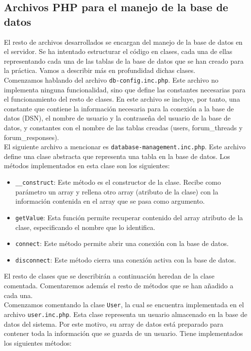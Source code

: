 \documentclass[11pt]{article}
\theoremstyle{plain}
\theoremstyle{definition}
\begin{document}
\subsection{Archivos PHP para el manejo de la base de datos}

El resto de archivos desarrollados se encargan del manejo de la base
de datos en el servidor. Se ha intentado estructurar el código en
clases, cada una de ellas representando cada una de las tablas de la
base de datos que se han creado para la práctica. Vamos
a describir más en profundidad dichas clases.\\

Comenzamos hablando del archivo \texttt{db-config.inc.php}. Este
archivo no implementa ninguna funcionalidad, sino que define las
constantes necesarias para el funcionamiento del resto de clases.  En
este archivo se incluye, por tanto, una constante que contiene la
información necesaria para la conexión a la base de datos (DSN), el
nombre de usuario y la contraseña del usuario de la base de datos, y
constantes con el nombre de las tablas creadas
(users, forum\_threads y forum\_responses).\\

El siguiente archivo a mencionar es
\texttt{database-management.inc.php}.  Este archivo define una clase
abstracta que representa una tabla en la base de datos. Los métodos
implementados en esta clase son los siguientes:

\begin{itemize}
\item \texttt{\_\_construct}: Este método es el constructor de la
  clase.  Recibe como parámetro un array y rellena otro array
  (atributo de la clase) con la información contenida en el array que
  se pasa como argumento.
\item \texttt{getValue}: Esta función permite recuperar contenido del
  array atributo de la clase, especificando el nombre que lo
  identifica.
\item \texttt{connect}: Este método permite abrir una conexión con la
  base de datos.
\item \texttt{disconnect}: Este método cierra una conexión activa con
  la base de datos.
\end{itemize}

El resto de clases que se describirán a continuación heredan de la
clase comentada. Comentaremos además el resto de métodos que se
han añadido a cada una.\\

Comenzamos comentando la clase \texttt{User}, la cual se encuentra
implementada en el archivo \texttt{user.inc.php}. Esta clase
representa un usuario almacenado en la base de datos del sistema. Por
este motivo, su array de datos está preparado para contener toda la
información que se guarda de un usuario. Tiene implementados los
siguientes métodos:
\end{document}
